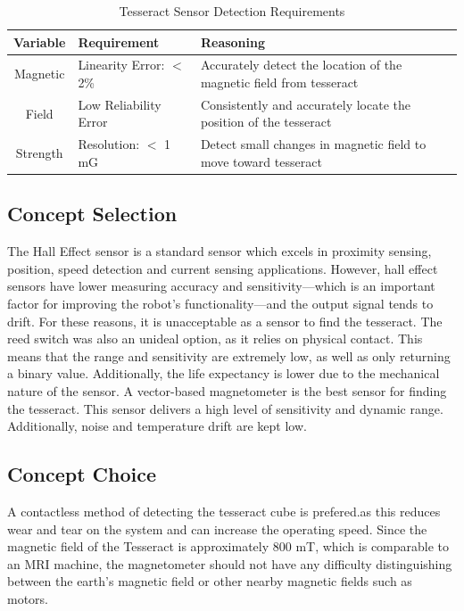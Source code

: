 \documentclass[12pt]{article}
\begin{document}
\begin{table}[htbp]
  \centering
  \caption{Tesseract Sensor Detection Requirements}
    \begin{tabular}{c|p{11.5em}|p{29.89em}}
    \multicolumn{1}{p{5.5em}|}{\textbf{Variable}} & \textbf{Requirement} & \textbf{Reasoning} \bigstrut[b]\\
    \hline
    Magnetic & Linearity Error: $<$ 2\% & Accurately detect the location of the magnetic field from tesseract \bigstrut[t]\\
    Field  & Low Reliability Error & Consistently and accurately locate the position of the tesseract \\
    Strength & Resolution: $<$ 1 mG & Detect small changes in magnetic field to move toward tesseract \\
    \end{tabular}%
  \label{tab:addlabel}%
\end{table}%


\subsection{Concept Selection}
The Hall Effect sensor is a standard sensor which excels in proximity sensing, position, speed detection and current sensing applications. However, hall effect sensors have lower measuring accuracy and sensitivity—which is an important factor for improving the robot’s functionality—and the output signal tends to drift. For these reasons, it is unacceptable as a sensor to find the tesseract.
The reed switch was also an unideal option, as it relies on physical contact. This means that the range and sensitivity are extremely low, as well as only returning a binary value. Additionally, the life expectancy is lower due to the mechanical nature of the sensor.
A vector-based magnetometer is the best sensor for finding the tesseract. This sensor delivers a high level of sensitivity and dynamic range. Additionally, noise and temperature drift are kept low. 

\subsection{Concept Choice}
A contactless method of detecting the tesseract cube is prefered.as this reduces wear and tear on the system and can increase the operating speed. Since the magnetic field of the Tesseract is approximately 800 mT, which is comparable to an MRI machine, the magnetometer should not have any difficulty distinguishing between the earth’s magnetic field or other nearby magnetic fields such as motors.
\end{document}
